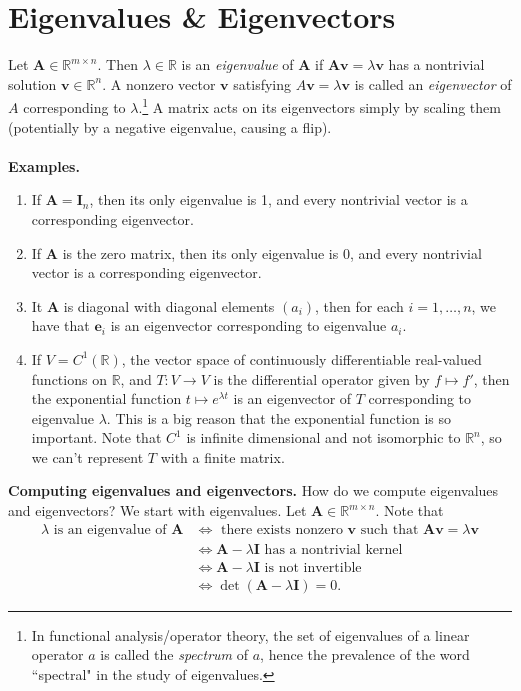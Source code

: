 \documentclass{article}
\begin{document}
\section{Eigenvalues \& Eigenvectors}
Let $\mathbf{A} \in \mathbb{R}^{m \times n}$. Then $\lambda \in \mathbb{R}$ is an \textit{eigenvalue} of $\mathbf{A}$ if $\mathbf{Av} =  \lambda\mathbf{v}$ has a nontrivial solution $\mathbf{v} \in \mathbb{R}^n$. A nonzero vector $\mathbf{v}$ satisfying $A\mathbf{v} =  \lambda \textbf{v}$ is called an \textit{eigenvector} of $A$ corresponding to $\lambda$.\footnote{In functional analysis/operator theory, the set of eigenvalues of a linear operator $a$ is called the \textit{spectrum} of $a$, hence the prevalence of the word ``spectral" in the study of eigenvalues.} A matrix acts on its eigenvectors simply by scaling them (potentially by a negative eigenvalue, causing a flip). 
\\ \\
\textbf{Examples.} 
\begin{enumerate}[label = (\alph*)]
\item If $\mathbf{A} = \mathbf{I}_n$, then its only eigenvalue is 1, and every nontrivial vector is a corresponding eigenvector. 
\item If $\mathbf{A}$ is the zero matrix, then its only eigenvalue is 0, and every nontrivial vector is a corresponding eigenvector. 
\item It $\mathbf{A}$ is diagonal with diagonal elements $(a_i)$, then for each $i = 1, \hdots, n$, we have that $\textbf{e}_i$ is an eigenvector corresponding to eigenvalue $a_i$.
\item If $V = C^1(\mathbb{R})$, the vector space of continuously differentiable real-valued functions on $\mathbb{R}$, and $T: V \to V$ is the differential operator given by $f \mapsto f'$, then the exponential function $t \mapsto e^{\lambda t}$ is an eigenvector of $T$ corresponding to eigenvalue $\lambda$. This is a big reason that the exponential function is so important. Note that $C^1$ is infinite dimensional and not isomorphic to $\mathbb{R}^n$, so we can't represent $T$ with a finite matrix.
\end{enumerate}
\textbf{Computing eigenvalues and eigenvectors.} How do we compute eigenvalues and eigenvectors? We start with eigenvalues. Let $\mathbf{A} \in \mathbb{R}^{m \times n}$. Note that
\begin{align*}
\lambda \text{ is an eigenvalue of } \mathbf{A} &\iff \text{ there exists nonzero }\mathbf{v}\text{ such that } \mathbf{Av} = \lambda \textbf{v} \\
&\iff \mathbf{A} - \lambda \mathbf{I} \text{ has a nontrivial kernel } \\
&\iff \mathbf{A} - \lambda \mathbf{I} \text{ is not invertible } \\
&\iff \det(\mathbf{A} - \lambda \mathbf{I}) = 0.
\end{align*}
\end{document}
